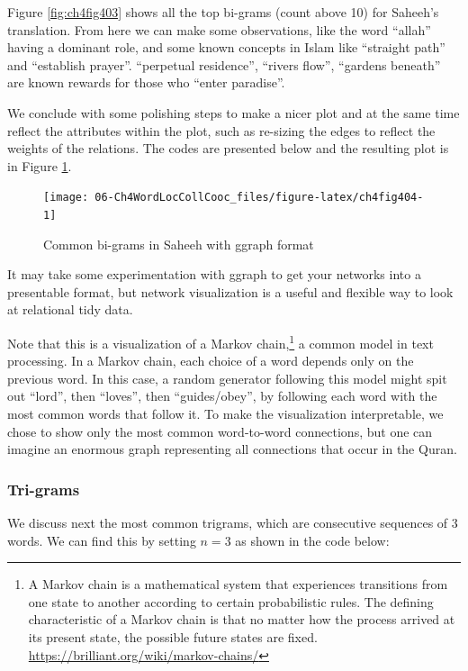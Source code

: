 \documentclass[
]{article}
\begin{document}
Figure \ref{fig:ch4fig403} shows all the top bi-grams (count above 10) for Saheeh's translation. From here we can make some observations, like the word ``allah'' having a dominant role, and some known concepts in Islam like ``straight path'' and ``establish prayer''. ``perpetual residence'', ``rivers flow'', ``gardens beneath'' are known rewards for those who ``enter paradise''.

We conclude with some polishing steps to make a nicer plot and at the same time reflect the attributes within the plot, such as re-sizing the edges to reflect the weights of the relations. The codes are presented below and the resulting plot is in Figure \ref{fig:ch4fig404}.

\begin{figure}

{\centering \texttt{[image: 06-Ch4WordLocCollCooc\_files/figure-latex/ch4fig404-1]} 

}

\caption{Common bi-grams in Saheeh with ggraph format}\label{fig:ch4fig404}
\end{figure}

It may take some experimentation with ggraph to get your networks into a presentable format, but network visualization is a useful and flexible way to look at relational tidy data.

Note that this is a visualization of a Markov chain,\footnote{A Markov chain is a mathematical system that experiences transitions from one state to another according to certain probabilistic rules. The defining characteristic of a Markov chain is that no matter how the process arrived at its present state, the possible future states are fixed. \url{https://brilliant.org/wiki/markov-chains/}} a common model in text processing. In a Markov chain, each choice of a word depends only on the previous word. In this case, a random generator following this model might spit out ``lord'', then ``loves'', then ``guides/obey'', by following each word with the most common words that follow it. To make the visualization interpretable, we chose to show only the most common word-to-word connections, but one can imagine an enormous graph representing all connections that occur in the Quran.

\hypertarget{tri-grams}{%
\subsubsection{Tri-grams}\label{tri-grams}}

We discuss next the most common trigrams, which are consecutive sequences of 3 words. We can find this by setting \(n = 3\) as shown in the code below:
\end{document}
